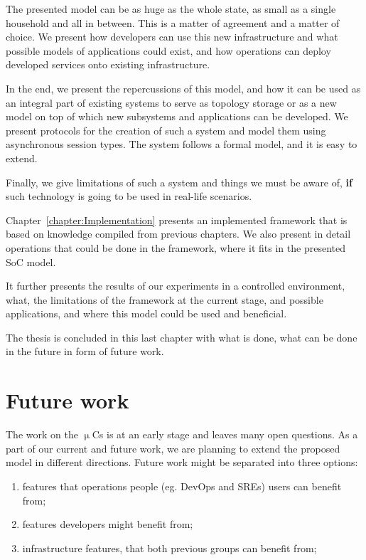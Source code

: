 The presented model can be as huge as the whole state, as small as a single household and all in between. This is a matter of agreement and a matter of choice. We present how developers can use this new infrastructure and what possible models of applications could exist, and how operations can deploy developed services onto existing infrastructure.

In the end, we present the repercussions of this model, and how it can be used as an integral part of existing systems to serve as topology storage or as a new model on top of which new subsystems and applications can be developed. We present protocols for the creation of such a system and model them using asynchronous session types. The system follows a formal model, and it is easy to extend.

Finally, we give limitations of such a system and things we must be aware of, \textbf{if} such technology is going to be used in real-life scenarios.

Chapter~\ref{chapter:Implementation} presents an implemented framework that is based on knowledge compiled from previous chapters. We also present in detail operations that could be done in the framework, where it fits in the presented SoC model.

It further presents the results of our experiments in a controlled environment, what, the limitations of the framework at the current stage, and possible applications, and where this model could be used and beneficial.

The thesis is concluded in this last chapter with what  is done, what can be done in the future in form of future work.
%
%
\section{Future work}\label{sec:future_work}
%
The work on the $\upmu$Cs is at an early stage and leaves many open questions. As a part of our current and future work, we are planning to extend the proposed model in different directions. Future work might be separated into three options:
 
\begin{enumerate}[start=1,label={(\bfseries \arabic*)}]
	\item features that operations people (eg. DevOps and SREs) users can benefit from;
	\item features developers might benefit from;
	\item infrastructure features, that both previous groups can benefit from;
\end{enumerate}

